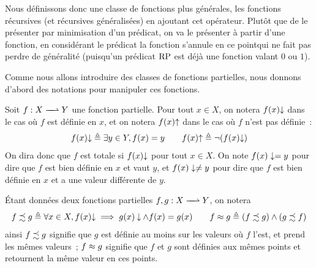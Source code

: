 Nous définissons donc une classe de fonctions plus générales, les fonctions
récursives (et récursives généralisées) en ajoutant cet opérateur. Plutôt que de
le présenter par minimisation d'un prédicat, on va le présenter à partir d'une
fonction, en considérant le prédicat \og la fonction s'annule en ce point\fg qui
ne fait pas perdre de généralité (puisqu'un prédicat $\operatorname{RP}$ est déjà une
fonction valant $0$ ou $1$).

Comme nous allons introduire des classes de fonctions partielles, nous donnons
d'abord des notations pour manipuler ces fonctions.

\begin{notation}
  Soit $\makeFunNamePartial{f}{X}{Y}$ une fonction partielle. Pour tout
  $x \in X$, on notera $f(x)\mathbin{\downarrow}$ dans le cas où $f$ est définie en $x$, et
  on notera $f(x)\mathbin{\uparrow}$ dans le cas où $f$ n'est pas définie~:
  \[f(x) \mathbin{\downarrow} \triangleq \exists y \in Y, f(x) = y \qquad
  f(x) \mathbin{\uparrow} \triangleq \lnot(f(x)\mathbin{\downarrow})\]
  On dira donc que $f$ est totale si $f(x)\mathbin{\downarrow}$ pour tout $x \in X$. On note
  $f(x)\mathrel{\mathord{\mathbin{\downarrow}}\mathord{=}} y$ pour dire que $f$ est bien définie en $x$ et vaut $y$, et
  $f(x)\mathrel{\mathord{\mathbin{\downarrow}}\mathord{\neq}} y$ pour dire que $f$ est bien définie en $x$ et a une valeur
  différente de $y$.

  \'Etant données deux fonctions partielles $\makeFunNamePartial{f,g}{X}{Y}$, on
  notera
  \[f\precsim g \triangleq \forall x \in X, f(x)\mathbin{\downarrow} \implies g(x)\mathbin{\downarrow} \land
  f(x) = g(x)\qquad
  f \approx g \triangleq (f \precsim g)\land(g\precsim f)\]
  ainsi $f\precsim g$ signifie que $g$ est définie au moins sur les valeurs où
  $f$ l'est, et prend les mêmes valeurs~; $f\approx g$ signifie que $f$ et $g$
  sont définies aux mêmes points et retournent la même valeur en ces points.
\end{notation}

